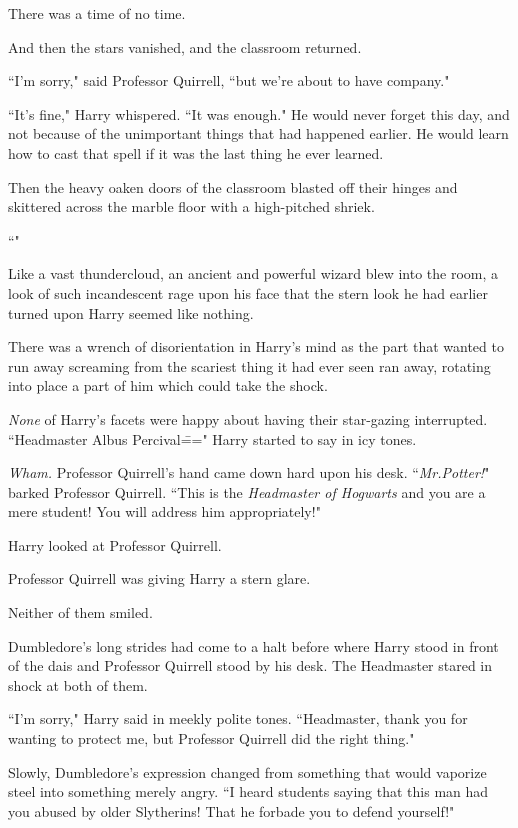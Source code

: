 There was a time of no time.

And then the stars vanished, and the classroom returned.

``I'm sorry," said Professor Quirrell, ``but we're about to have company."

``It's fine," Harry whispered. ``It was enough." He would never forget this day, and not because of the unimportant things that had happened earlier. He would learn how to cast that spell if it was the last thing he ever learned.

Then the heavy oaken doors of the classroom blasted off their hinges and skittered across the marble floor with a high-pitched shriek.

``"

Like a vast thundercloud, an ancient and powerful wizard blew into the room, a look of such incandescent rage upon his face that the stern look he had earlier turned upon Harry seemed like nothing.

There was a wrench of disorientation in Harry's mind as the part that wanted to run away screaming from the scariest thing it had ever seen ran away, rotating into place a part of him which could take the shock.

\emph{None} of Harry's facets were happy about having their star-gazing interrupted. ``Headmaster Albus Percival\===" Harry started to say in icy tones.

\emph{Wham.} Professor Quirrell's hand came down hard upon his desk. ``\emph{Mr.\?Potter!}" barked Professor Quirrell. ``This is the \emph{Headmaster of Hogwarts} and you are a mere student! You will address him appropriately!"

Harry looked at Professor Quirrell.

Professor Quirrell was giving Harry a stern glare.

Neither of them smiled.

Dumbledore's long strides had come to a halt before where Harry stood in front of the dais and Professor Quirrell stood by his desk. The Headmaster stared in shock at both of them.

``I'm sorry," Harry said in meekly polite tones. ``Headmaster, thank you for wanting to protect me, but Professor Quirrell did the right thing."

Slowly, Dumbledore's expression changed from something that would vaporize steel into something merely angry. ``I heard students saying that this man had you abused by older Slytherins! That he forbade you to defend yourself!"

